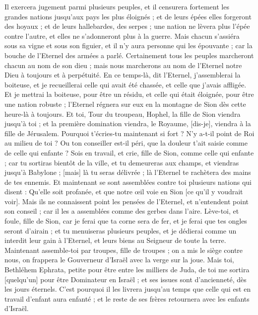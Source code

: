\begin{multicols}{2}
Il exercera jugement parmi plusieurs peuples, et il censurera fortement les grandes nations jusqu'aux pays les plus éloignés ; et de leurs épées elles forgeront des hoyaux ; et de leurs hallebardes, des serpes ; une nation ne lèvera plus l'épée contre l'autre, et elles ne s'adonneront plus à la guerre.
Mais chacun s'assiéra sous sa vigne et sous son figuier, et il n'y aura personne qui les épouvante ; car la bouche de l'Eternel des armées a parlé.
Certainement tous les peuples marcheront chacun au nom de son dieu ; mais nous marcherons au nom de l'Eternel notre Dieu à toujours et à perpétuité.
En ce temps-là, dit l'Eternel, j'assemblerai la boiteuse, et je recueillerai celle qui avait été chassée, et celle que j'avais affligée.
Et je mettrai la boiteuse, pour être un résidu, et celle qui était éloignée, pour être une nation robuste ; l'Eternel régnera sur eux en la montagne de Sion dès cette heure-là à toujours.
Et toi, Tour du troupeau, Hophel, la fille de Sion viendra jusqu'à toi ; et la première domination viendra, le Royaume, [dis-je], viendra à la fille de Jérusalem.
Pourquoi t'écries-tu maintenant si fort ? N'y a-t-il point de Roi au milieu de toi ? Ou ton conseiller est-il péri, que la douleur t'ait saisie comme de celle qui enfante ?
Sois en travail, et crie, fille de Sion, comme celle qui enfante ; car tu sortiras bientôt de la ville, et tu demeureras aux champs, et viendras jusqu'à Babylone ; [mais] là tu seras délivrée ; là l'Eternel te rachètera des mains de tes ennemis.
Et maintenant se sont assemblées contre toi plusieurs nations qui disent : Qu'elle soit profanée, et que notre œil voie en Sion [ce qu'il y voudrait voir].
Mais ils ne connaissent point les pensées de l'Eternel, et n'entendent point son conseil ; car il les a assemblées comme des gerbes dans l'aire.
Lève-toi, et foule, fille de Sion, car je ferai que ta corne sera de fer, et je ferai que tes ongles seront d'airain ; et tu menuiseras plusieurs peuples, et je dédierai comme un interdit leur gain à l'Eternel, et leurs biens au Seigneur de toute la terre.
\VerseOne{}Maintenant assemble-toi par troupes, fille de troupes ; on a mis le siège contre nous, on frappera le Gouverneur d'Israël avec la verge sur la joue.
Mais toi, Bethléhem Ephrata, petite pour être entre les milliers de Juda, de toi me sortira [quelqu'un] pour être Dominateur en Israël ; et ses issues sont d'ancienneté, dès les jours éternels.
C'est pourquoi il les livrera jusqu'au temps que celle qui est en travail d'enfant aura enfanté ; et le reste de ses frères retournera avec les enfants d'Israël.

\end{multicols}
